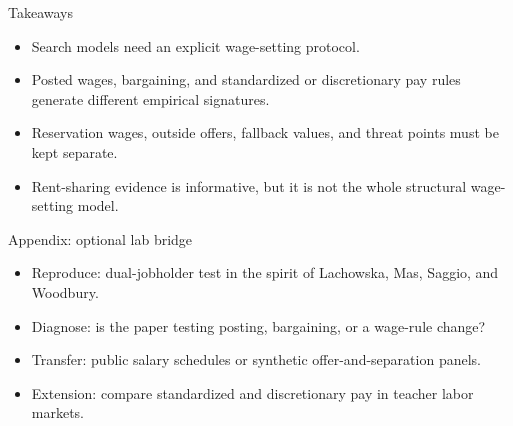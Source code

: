 \documentclass[aspectratio=169,11pt]{beamer}
\begin{document}
\begin{frame}{Takeaways}
\begin{itemize}
    \item Search models need an explicit wage-setting protocol.
    \item Posted wages, bargaining, and standardized or discretionary pay rules generate different empirical signatures.
    \item Reservation wages, outside offers, fallback values, and threat points must be kept separate.
    \item Rent-sharing evidence is informative, but it is not the whole structural wage-setting model.
\end{itemize}
\end{frame}

\appendix

\begin{frame}{Appendix: optional lab bridge}
\begin{itemize}
    \item Reproduce: dual-jobholder test in the spirit of Lachowska, Mas, Saggio, and Woodbury.
    \item Diagnose: is the paper testing posting, bargaining, or a wage-rule change?
    \item Transfer: public salary schedules or synthetic offer-and-separation panels.
    \item Extension: compare standardized and discretionary pay in teacher labor markets.
\end{itemize}
\end{frame}
\end{document}
